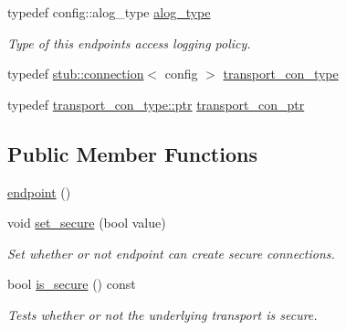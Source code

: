 \begin{DoxyCompactItemize}
typedef config\+::alog\+\_\+type \hyperlink{classwebsocketpp_1_1transport_1_1stub_1_1endpoint_aa62a4dd626d9b8757972c0ef66e72419}{alog\+\_\+type}
\begin{DoxyCompactList}\small\item\em Type of this endpoint\textquotesingle{}s access logging policy. \end{DoxyCompactList}\item 
typedef \hyperlink{classwebsocketpp_1_1transport_1_1stub_1_1connection}{stub\+::connection}$<$ config $>$ \hyperlink{classwebsocketpp_1_1transport_1_1stub_1_1endpoint_a6486b94320ba134cb60a63b4c40194a0}{transport\+\_\+con\+\_\+type}
\item 
typedef \hyperlink{classwebsocketpp_1_1transport_1_1stub_1_1connection_aeb856d2a6734d303e13bed57c3d1081b}{transport\+\_\+con\+\_\+type\+::ptr} \hyperlink{classwebsocketpp_1_1transport_1_1stub_1_1endpoint_af2bad83f2577d578712642e11767efe1}{transport\+\_\+con\+\_\+ptr}
\end{DoxyCompactItemize}
\subsection*{Public Member Functions}
\begin{DoxyCompactItemize}
\item 
\hyperlink{classwebsocketpp_1_1transport_1_1stub_1_1endpoint_a7ff8f4ae45d67a25afc8538ae3d02198}{endpoint} ()
\item 
void \hyperlink{classwebsocketpp_1_1transport_1_1stub_1_1endpoint_a5e7ffca4157517d74c6f433e016f05e8}{set\+\_\+secure} (bool value)
\begin{DoxyCompactList}\small\item\em Set whether or not endpoint can create secure connections. \end{DoxyCompactList}\item 
bool \hyperlink{classwebsocketpp_1_1transport_1_1stub_1_1endpoint_ab2e17bd4a64f9a6af40611f7b6cd5c1b}{is\+\_\+secure} () const 
\begin{DoxyCompactList}\small\item\em Tests whether or not the underlying transport is secure. \end{DoxyCompactList}\end{DoxyCompactItemize}
